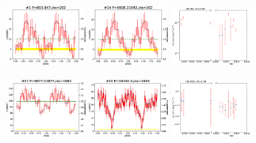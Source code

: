 \documentclass{aastex63}
\begin{document}
\begin{figure}[ht]
\centering
\includegraphics[angle =0, width = 0.235\textwidth]{./figure/LW/pfold_lc_324001_cut.eps}
\hfill
\includegraphics[angle =0, width = 0.235\textwidth]{./figure/LW/pfold_lc_324002_cut.eps}
\hfill
\includegraphics[angle =0, width = 0.231\textwidth]{./figure/LW/324001_lc_cut.eps}
\hfill
{}
\end{figure}
\begin{figure}[ht]
\centering
\includegraphics[angle =0, width = 0.235\textwidth]{./figure/LW/pfold_lc_153001_cut.eps}
\hfill
\includegraphics[angle =0, width = 0.235\textwidth]{./figure/LW/pfold_lc_153002_cut.eps}
\hfill
\includegraphics[angle =0, width = 0.231\textwidth]{./figure/LW/153001_lc_cut.eps}
\hfill
{}
\end{figure}
\end{document}
